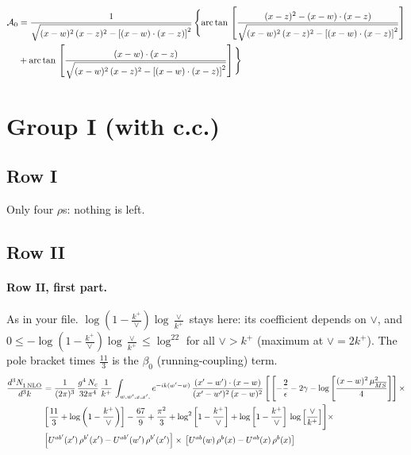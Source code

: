\documentclass[10pt]{article}
\numberwithin{equation}{section}
\begin{document}
\begin{align}
\mathcal{A}_{0} & = \frac{1}{\sqrt{(x-w)^{2}\,(x-z)^{2}-\left[(x-w)\cdot (x-z)\right]^{2}}}\, \Bigg\{\mathrm{arc\,tan}\,\left[\frac{(x-z)^{2}-(x-w)\cdot (x-z)}{\sqrt{(x-w)^{2}\,(x-z)^{2}-\left[(x-w)\cdot (x-z)\right]^{2}}}\right]\notag \\ & + \mathrm{arc\,tan}\,\left[\frac{(x-w)\cdot (x-z)}{\sqrt{(x-w)^{2}\,(x-z)^{2}-\left[(x-w)\cdot (x-z)\right]^{2}}}\right] \Bigg\}
\label{eq:A0}
\end{align}

\section{Group I (with c.c.)}\label{sec:RgI}
\subsection{Row I}
Only four $\rho$\textquotesingle s: nothing is left.
\subsection{Row II}
\paragraph{Row II, first part.}
As in your file. $\log(1-\frac{k^+}{\vee})\log\frac{\vee}{k^+}$ stays here: its coefficient depends on $\vee$, and $0\le-\log(1-\frac{k^+}{\vee})\log\frac{\vee}{k^+}\le\log^22$ for all $\vee>k^+$ (maximum at $\vee=2k^+$). The pole bracket times $\frac{11}{3}$ is the $\beta_0$ (running-coupling) term.
\begin{align}
     \frac{d^{3}N_{1\,\rm NLO}^{\rm}}{d^{3}k} &  =  \frac{1}{(2\pi)^{3}}\, \frac{g^{4}\,N_{c}}{32\pi^{4}}\,\frac{1}{k^{+}}\, \int_{w, w',x,x',} e^{-ik(w^\prime-w)}\, \frac{(x'-w')\cdot (x-w)}{(x'-w')^{2}\, (x-w)^{2}}\, \Bigg[\left[-\frac{2}{\epsilon}-2\gamma-\log{\left[\frac{(x-w)^{2}\,\mu^{2}_{\overline{MS}}}{4}\right]}\right]\times \notag \\ & \left[\frac{11}{3}+\log{\left(1-\frac{k^{+}}{\vee}\right)}\right]-\frac{67}{9}+\frac{\pi^{2}}{3}+\log^{2}{\left[1-\frac{k^{+}}{\vee}\right]}+\log{\left[1-\frac{k^{+}}{\vee}\right]}\,\log{\left[\frac{\vee}{k^{+}}\right]}\Bigg]\times\notag \\ & \left[U^{ab'}(x')\,\rho^{b'}(x') - U^{ab'}(w')\,\rho^{b'}(x')\right]\times\,\left[U^{ab}(w)\,\rho^{b}(x) - U^{ab}(x)\,\rho^{b}(x)\right] \label{eq:R:G1II1}
\end{align}
\end{document}
